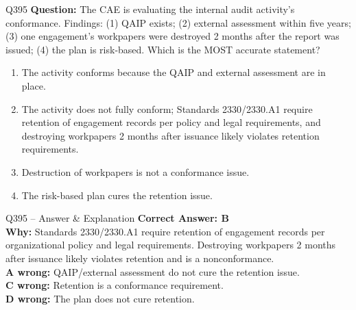 \documentclass[aspectratio=169,10pt]{beamer}
\begin{document}
	\begin{frame}[t]{Q395}
		\small
		\textbf{Question:} The CAE is evaluating the internal audit activity's conformance. Findings: (1) QAIP exists; (2) external assessment within five years; (3) one engagement's workpapers were destroyed 2 months after the report was issued; (4) the plan is risk-based. Which is the MOST accurate statement?
		\begin{enumerate}[label=\Alph*.,itemsep=1pt,topsep=2pt]
			\item The activity conforms because the QAIP and external assessment are in place.
			\item The activity does not fully conform; Standards 2330/2330.A1 require retention of engagement records per policy and legal requirements, and destroying workpapers 2 months after issuance likely violates retention requirements.
			\item Destruction of workpapers is not a conformance issue.
			\item The risk-based plan cures the retention issue.
		\end{enumerate}
	\end{frame}
	
	\begin{frame}[t]{Q395 -- Answer \& Explanation}
		\small
		\textbf{Correct Answer: B} \\[4pt]
		\textbf{Why:} Standards 2330/2330.A1 require retention of engagement records per organizational policy and legal requirements. Destroying workpapers 2 months after issuance likely violates retention and is a nonconformance. \\[4pt]
		\textbf{A wrong:} QAIP/external assessment do not cure the retention issue. \\[2pt]
		\textbf{C wrong:} Retention is a conformance requirement. \\[2pt]
		\textbf{D wrong:} The plan does not cure retention.
	\end{frame}
	
\end{document}
